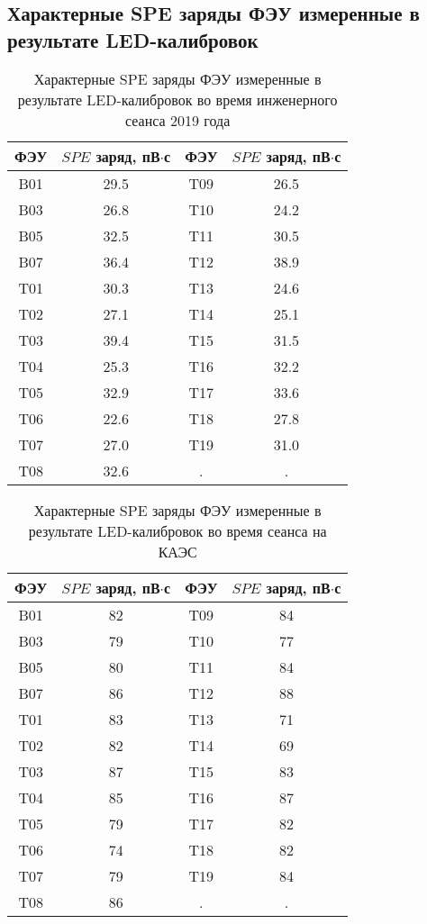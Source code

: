 \chapter{}
\label{AppendixA}
\section{Характерные SPE заряды ФЭУ измеренные в результате LED-калибровок} 
\label{AppendixA1}
\begin{table}[H]
    \centering
    \caption{Характерные SPE заряды ФЭУ измеренные в результате LED-калибровок во время инженерного сеанса 2019 года}
\begin{tabular}{|c|c|c|c|}
\hline ФЭУ & $S P E$ заряд, пВ$\cdot$с & ФЭУ & $S P E$ заряд, пВ$\cdot$с \\
\hline B01 & 29.5 & T09 & 26.5 \\
\hline B03 & 26.8 & T10 & 24.2 \\
\hline B05 & 32.5 & T11 & 30.5 \\
\hline B07 & 36.4 & T12 & 38.9 \\
\hline T01 & 30.3 & T13 & 24.6 \\
\hline T02 & 27.1 & T14 & 25.1 \\
\hline T03 & 39.4 & T15 & 31.5 \\
\hline T04 & 25.3 & T16 & 32.2 \\
\hline T05 & 32.9 & T17 & 33.6 \\
\hline T06 & 22.6 & T18 & 27.8 \\
\hline T07 & 27.0 & T19 & 31.0 \\
\hline T08 & 32.6 & . & . \\
\hline
\end{tabular}
\label{spetable2019}
\end{table}

\begin{table}[H]
    \centering
    \caption{Характерные SPE заряды ФЭУ измеренные в результате LED-калибровок во время сеанса на КАЭС}
\begin{tabular}{|c|c|c|c|}
\hline ФЭУ & $S P E$ заряд, пВ$\cdot$с & ФЭУ & $S P E$ заряд, пВ$\cdot$с \\
\hline B01 & 82 & T09 & 84 \\
\hline B03 & 79 & T10 & 77 \\
\hline B05 & 80 & T11 & 84 \\
\hline B07 & 86 & T12 & 88 \\
\hline T01 & 83 & T13 & 71 \\
\hline T02 & 82 & T14 & 69 \\
\hline T03 & 87 & T15 & 83 \\
\hline T04 & 85 & T16 & 87 \\
\hline T05 & 79 & T17 & 82 \\
\hline T06 & 74 & T18 & 82 \\
\hline T07 & 79 & T19 & 84 \\
\hline T08 & 86 & . & . \\
\hline
\end{tabular}
\label{spetable2022}
\end{table}

